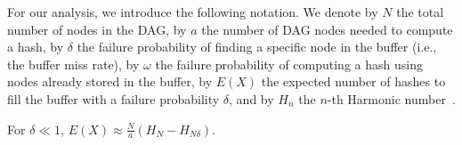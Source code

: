 \documentclass[runningheads]{llncs}
\begin{document}


For our analysis, we introduce the following notation. We denote by $N$ the total number of nodes in the DAG, by $a$ the number of DAG nodes needed to compute a hash, by $\delta$ the failure probability of finding a specific node in the buffer (i.e., the buffer miss rate), by $\omega$ the failure probability of computing a hash using nodes already stored in the buffer, by $E(X)$ the expected number of hashes to fill the buffer with a failure probability $\delta$, and by $H_n$ the $n$-th Harmonic number~\cite{harmonicNumber}.
\begin{claim}
For $\delta \ll 1$, $E(X) \approx \frac{N}{a}(H_{N} -H_{N\delta}).$
\end{claim}
\end{document}
